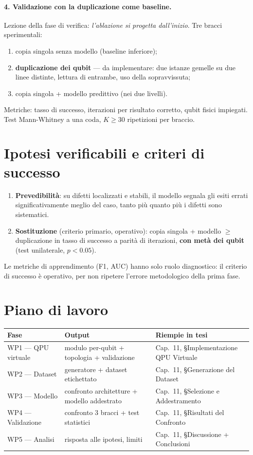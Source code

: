 \documentclass[11pt,a4paper]{article}
\begin{document}
\paragraph{4. Validazione con la duplicazione come baseline.}
Lezione della fase di verifica: \emph{l'ablazione si progetta dall'inizio}. Tre bracci sperimentali:
\begin{enumerate}[label=(\alph*), nosep]
    \item copia singola senza modello (baseline inferiore);
    \item \textbf{duplicazione dei qubit} --- da implementare: due istanze gemelle su due linee distinte, lettura di entrambe, uso della sopravvissuta;
    \item copia singola + modello predittivo (nei due livelli).
\end{enumerate}
Metriche: tasso di successo, iterazioni per risultato corretto, qubit fisici impiegati. Test Mann-Whitney a una coda, $K \geq 30$ ripetizioni per braccio.

\section{Ipotesi verificabili e criteri di successo}
\begin{enumerate}[nosep]
    \item \textbf{Prevedibilità}: su difetti localizzati e stabili, il modello segnala gli esiti errati significativamente meglio del caso, tanto più quanto più i difetti sono sistematici.
    \item \textbf{Sostituzione} (criterio primario, operativo): copia singola + modello $\geq$ duplicazione in tasso di successo a parità di iterazioni, \textbf{con metà dei qubit} (test unilaterale, $p<0.05$).
\end{enumerate}
Le metriche di apprendimento (F1, AUC) hanno solo ruolo diagnostico: il criterio di successo è operativo, per non ripetere l'errore metodologico della prima fase.

\section{Piano di lavoro}
\begin{center}
\begin{tabular}{llp{6.8cm}}
\toprule
\textbf{Fase} & \textbf{Output} & \textbf{Riempie in tesi} \\
\midrule
WP1 --- QPU virtuale & modulo per-qubit + topologia + validazione & Cap.~11, §Implementazione QPU Virtuale \\
WP2 --- Dataset & generatore + dataset etichettato & Cap.~11, §Generazione del Dataset \\
WP3 --- Modello & confronto architetture + modello addestrato & Cap.~11, §Selezione e Addestramento \\
WP4 --- Validazione & confronto 3 bracci + test statistici & Cap.~11, §Risultati del Confronto \\
WP5 --- Analisi & risposta alle ipotesi, limiti & Cap.~11, §Discussione + Conclusioni \\
\bottomrule
\end{tabular}
\end{center}
\end{document}
